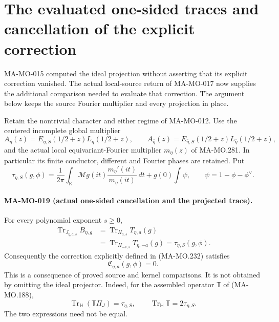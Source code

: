 \section{The evaluated one-sided traces and cancellation of the explicit correction}
\label{sec:projected-trace-cancellation}

MA-MO-015 computed the ideal projection without asserting that
its explicit correction vanished.  The actual local-source
return of MA-MO-017 now supplies the additional comparison
needed to evaluate that correction.  The argument below keeps
the source Fourier multiplier and every projection in place.

Retain the nontrivial character and either regime of MA-MO-012.
Use the centered incomplete global multiplier
\[
 A_\eta(z)=E_{\eta,S}(1/2+z)L_\eta(1/2+z),\qquad
 A_{\bar\eta}(z)=E_{\bar\eta,S}(1/2+z)L_{\bar\eta}(1/2+z),
 \tag{MA-MO.360}
\]
and the actual local equivariant-Fourier multiplier
\(m_\eta(z)\) of MA-MO.281.  In particular its finite
conductor, different and Fourier phases are retained.  Put
\[
 \tau_{\eta,S}(g,\phi)=\frac1{2\pi}\int_{\mathbb R}
        \mathcal Mg(it)\frac{m_\eta'(it)}{m_\eta(it)}\,dt
                    +g(0)\int\psi,
       \qquad \psi=1-\phi-\phi^\vee.
 \tag{MA-MO.361}
\]

\paragraph{MA-MO-019 (actual one-sided cancellation and the projected trace).}
For every polynomial exponent \(s\ge0\),
\[
 \begin{aligned}
 \operatorname{Tr}_{J_{\eta,a,s}}B_{\eta,g}
 &=\operatorname{Tr}_{H_{a,s}}T_{\eta,a}(g)\\
 &=\operatorname{Tr}_{H_{-a,s}}T_{\eta,-a}(g)
  =\tau_{\eta,S}(g,\phi).
 \end{aligned}
 \tag{MA-MO.362}
\]
Consequently the correction explicitly defined in (MA-MO.232)
satisfies
\[
                    \mathfrak C_{\eta,a}(g,\phi)=0.
 \tag{MA-MO.363}
\]
This is a consequence of proved source and kernel comparisons.
It is not obtained by omitting the ideal projector.  Indeed,
for the assembled operator \(\mathbb T\) of (MA-MO.188),
\[
 \operatorname{Tr}_{\mathbb H}(\mathbb T\Pi_J)=\tau_{\eta,S},
 \qquad
 \operatorname{Tr}_{\mathbb H}\mathbb T=2\tau_{\eta,S}.
 \tag{MA-MO.364}
\]
The two expressions need not be equal.


